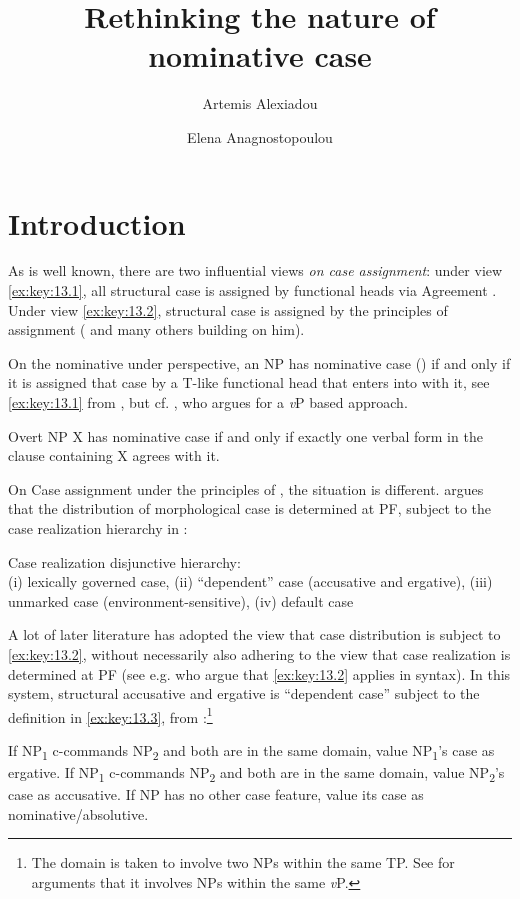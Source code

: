 \documentclass[output=paper]{langsci/langscibook}
\author{Artemis Alexiadou\affiliation{Humboldt Universität zu
    Berlin/Leibniz-Zentrum Allgemeine Sprachwissenschaft}\and Elena
Anagnostopoulou\affiliation{University of Crete}}
\title{Rethinking the nature of nominative case}
\begin{document}
\glsresetall

\section{Introduction}

As is well known, there are two influential views \emph{on case assignment}:
under view \eqref{ex:key:13.1}, all structural case is assigned by functional
heads via Agreement \citep{Chomsky2001}. Under view \eqref{ex:key:13.2},
structural case is assigned by the principles of  assignment
(\citealt{Marantz1991} and many others building on him).

On the nominative under  perspective, an NP has nominative case (\Nom) if
and only if it is assigned that case by a T-like functional head that enters
into  with it, see \eqref{ex:key:13.1} from \citet{Baker2015}, but cf.
\textcite{Sigurdsson2000}, who argues for a \emph{v}P based approach.

\ea\label{ex:key:13.1} Overt NP X has nominative case if and only if exactly
    one verbal form in the clause containing X agrees with it.
\z

On Case assignment under the principles of , the situation is
different. \citet{Marantz1991} argues that the distribution of morphological
case is determined at PF, subject to the case realization hierarchy in
:

\ea%
    \label{ex:key:13.2} Case realization disjunctive hierarchy:\\
    (i) lexically governed case, (ii) \enquote{dependent} case (accusative and
    ergative), (iii) unmarked case (environment-sensitive), (iv) default case
\z

A lot of later literature has adopted the view that case distribution is
subject to \eqref{ex:key:13.2}, without necessarily also adhering to the view
that case realization is determined at PF (see e.g.
\citealt{Preminger2014,Baker2015} who argue that \eqref{ex:key:13.2} applies in
syntax). In this system, structural accusative and ergative is “dependent case”
subject to the definition in \eqref{ex:key:13.3}, from
\citet[74]{Baker2015}:\footnote{The domain is taken to involve two NPs within
    the same TP. See \citet{Schafer2012} for arguments that it involves NPs
within the same \emph{v}P.}

\ea%
    \label{ex:key:13.3}
    \ea If NP\textsubscript{1} c-commands NP\textsubscript{2} and both are in
        the same domain, value NP\textsubscript{1}’s case as ergative.
    \ex If NP\textsubscript{1} c-commands NP\textsubscript{2} and both are in
        the same domain, value NP\textsubscript{2}’s case as accusative.
    \ex If NP has no other case feature, value its case as
        nominative/absolutive.
    \z
\z
\end{document}
